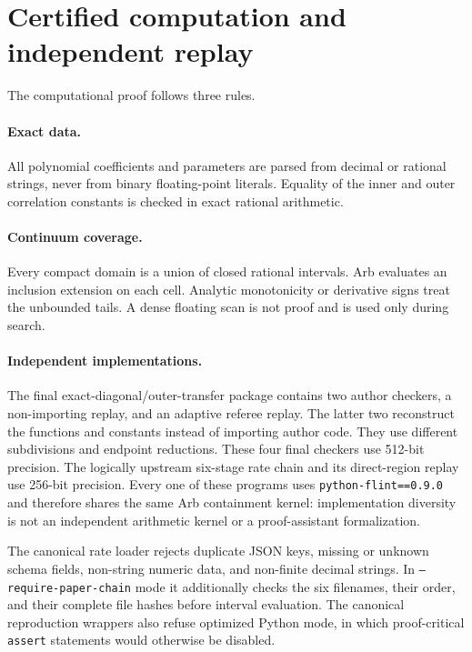 \section{Certified computation and independent replay}\label{sec:computation}

The computational proof follows three rules.

\paragraph{Exact data.}
All polynomial coefficients and parameters are parsed from decimal or
rational strings, never from binary floating-point literals.  Equality of
the inner and outer correlation constants is checked in exact rational
arithmetic.

\paragraph{Continuum coverage.}
Every compact domain is a union of closed rational intervals.  Arb evaluates
an inclusion extension on each cell.  Analytic monotonicity or derivative
signs treat the unbounded tails.  A dense floating scan is not proof and is
used only during search.

\paragraph{Independent implementations.}
The final exact-diagonal/outer-transfer package contains two author checkers, a
non-importing replay, and an adaptive referee replay.  The latter two
reconstruct the functions and constants instead of importing author code.
They use different subdivisions and endpoint reductions.  These four final
checkers use 512-bit precision.  The logically upstream six-stage rate chain
and its direct-region replay use 256-bit precision.  Every one of these
programs uses \texttt{python-flint==0.9.0} and therefore shares the same Arb
containment kernel: implementation diversity is not an independent arithmetic
kernel or a proof-assistant formalization.

The canonical rate loader rejects duplicate JSON keys, missing or unknown
schema fields, non-string numeric data, and non-finite decimal strings.  In
\texttt{--require-paper-chain} mode it additionally checks the six filenames,
their order, and their complete file hashes before interval evaluation.  The
canonical reproduction wrappers also refuse optimized Python mode, in which
proof-critical \texttt{assert} statements would otherwise be disabled.

